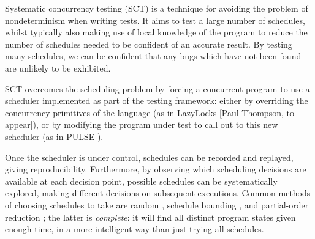 Systematic concurrency testing (SCT) \citep{dpor, pbound, heisenbugs,
  empirical} is a technique for avoiding the problem of nondeterminism
when writing tests. It aims to test a large number of schedules,
whilst typically also making use of local knowledge of the program to
reduce the number of schedules needed to be confident of an accurate
result. By testing many schedules, we can be confident that any bugs
which have not been found are unlikely to be exhibited.

SCT overcomes the scheduling problem by forcing a concurrent program
to use a scheduler implemented as part of the testing framework:
either by overriding the concurrency primitives of the language (as in
LazyLocks [Paul Thompson, to appear]), or by modifying the program
under test to call out to this new scheduler (as in PULSE
\citep{pulse}).

Once the scheduler is under control, schedules can be recorded and
replayed, giving reproducibility. Furthermore, by observing which
scheduling decisions are available at each decision point, possible
schedules can be systematically explored, making different decisions
on subsequent executions. Common methods of choosing schedules to take
are random \citep{empirical}, schedule bounding \citep{pbound}, and
partial-order reduction \citep{dpor}; the latter is \emph{complete}:
it will find all distinct program states given enough time, in a more
intelligent way than just trying all schedules.
